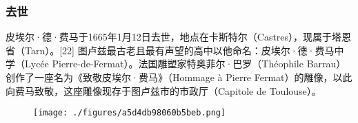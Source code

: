 \subsubsection{去世}  
皮埃尔·德·费马于1665年1月12日去世，地点在卡斯特尔（Castres），现属于塔恩省（Tarn）。[22] 图卢兹最古老且最有声望的高中以他命名：皮埃尔·德·费马中学（Lycée Pierre-de-Fermat）。法国雕塑家特奥菲尔·巴罗（Théophile Barrau）创作了一座名为《致敬皮埃尔·费马》（Hommage à Pierre Fermat）的雕像，以此向费马致敬，这座雕像现存于图卢兹市的市政厅（Capitole de Toulouse）。
\begin{figure}[ht]
\centering
\texttt{[image: ./figures/a5d4db98060b5beb.png]}
\caption{} \label{fig_Pierre_3}
\end{figure}